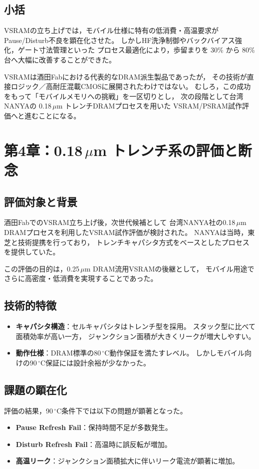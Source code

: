 \documentclass[conference]{IEEEtran}
\begin{document}
\subsection{小括}
VSRAMの立ち上げでは，モバイル仕様に特有の低消費・高温要求が
Pause/Disturb不良を顕在化させた。
しかしHF洗浄制御やバックバイアス強化，ゲート寸法管理といった
プロセス最適化により，歩留まりを 30\% から 80\%台へ大幅に改善することができた。

VSRAMは酒田Fabにおける代表的なDRAM派生製品であったが，
その技術が直接ロジック／高耐圧混載CMOSに展開されたわけではない。
むしろ，この成功をもって「モバイルメモリへの挑戦」を一区切りとし，
次の段階として台湾NANYAの 0.18\,$\mu$m トレンチDRAMプロセスを用いた
VSRAM/PSRAM試作評価へと進むことになる。

\section{第4章：0.18\,\texorpdfstring{$\mu$m}{μm} トレンチ系の評価と断念}

\subsection{評価対象と背景}
酒田FabでのVSRAM立ち上げ後，次世代候補として
台湾NANYA社の0.18\,$\mu$m DRAMプロセスを利用したVSRAM試作評価が検討された。
NANYAは当時，東芝と技術提携を行っており，
トレンチキャパシタ方式をベースとしたプロセスを提供していた。

この評価の目的は，0.25\,$\mu$m DRAM流用VSRAMの後継として，
モバイル用途でさらに高密度・低消費を実現することであった。

\subsection{技術的特徴}
\begin{itemize}
  \item \textbf{キャパシタ構造}：セルキャパシタはトレンチ型を採用。
        スタック型に比べて面積効率が高い一方，
        ジャンクション面積が大きくリークが増大しやすい。
  \item \textbf{動作仕様}：DRAM標準の80\,$^\circ$C動作保証を満たすレベル。
        しかしモバイル向けの90\,$^\circ$C保証には設計余裕が少なかった。
\end{itemize}

\subsection{課題の顕在化}
評価の結果，90\,$^\circ$C条件下では以下の問題が顕著となった。
\begin{itemize}
  \item \textbf{Pause Refresh Fail}：保持時間不足が多数発生。
  \item \textbf{Disturb Refresh Fail}：高温時に誤反転が増加。
  \item \textbf{高温リーク}：ジャンクション面積拡大に伴いリーク電流が顕著に増加。
\end{itemize}
\end{document}
